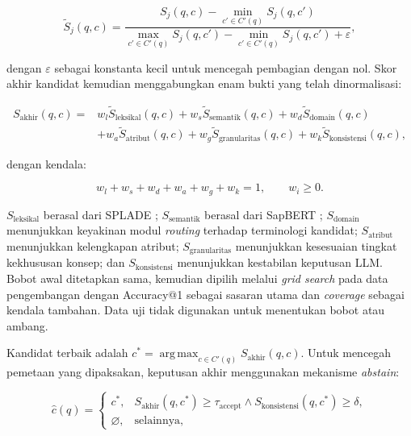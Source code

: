 \begin{equation}
\widetilde{S}_{j}(q,c)=
\frac{S_j(q,c)-\min_{c'\in C'(q)}S_j(q,c')}
{\max_{c'\in C'(q)}S_j(q,c')-\min_{c'\in C'(q)}S_j(q,c')+\varepsilon},
\label{eq:score-normalization}
\end{equation}

dengan $\varepsilon$ sebagai konstanta kecil untuk mencegah pembagian dengan nol. Skor akhir kandidat kemudian menggabungkan enam bukti yang telah dinormalisasi:

\begin{equation}
\begin{split}
S_{\mathrm{akhir}}(q,c)={}&
w_l\widetilde{S}_{\mathrm{leksikal}}(q,c)
+w_s\widetilde{S}_{\mathrm{semantik}}(q,c)
+w_d\widetilde{S}_{\mathrm{domain}}(q,c)\\
&+w_a\widetilde{S}_{\mathrm{atribut}}(q,c)
+w_g\widetilde{S}_{\mathrm{granularitas}}(q,c)
+w_k\widetilde{S}_{\mathrm{konsistensi}}(q,c),
\end{split}
\label{eq:final-mapping-score}
\end{equation}

dengan kendala:

\begin{equation}
w_l+w_s+w_d+w_a+w_g+w_k=1,
\qquad w_i\geq0.
\label{eq:score-weight-constraint}
\end{equation}

$S_{\mathrm{leksikal}}$ berasal dari SPLADE \citep{formal_splade_2021}; $S_{\mathrm{semantik}}$ berasal dari SapBERT \citep{liu_self-alignment_2021}; $S_{\mathrm{domain}}$ menunjukkan keyakinan modul \textit{routing} terhadap terminologi kandidat; $S_{\mathrm{atribut}}$ menunjukkan kelengkapan atribut; $S_{\mathrm{granularitas}}$ menunjukkan kesesuaian tingkat kekhususan konsep; dan $S_{\mathrm{konsistensi}}$ menunjukkan kestabilan keputusan LLM. Bobot awal ditetapkan sama, kemudian dipilih melalui \textit{grid search} pada data pengembangan dengan Accuracy@1 sebagai sasaran utama dan \textit{coverage} sebagai kendala tambahan. Data uji tidak digunakan untuk menentukan bobot atau ambang.

Kandidat terbaik adalah $c^*=\operatorname*{arg\,max}_{c\in C'(q)}S_{\mathrm{akhir}}(q,c)$. Untuk mencegah pemetaan yang dipaksakan, keputusan akhir menggunakan mekanisme \textit{abstain}:

\begin{equation}
\widehat{c}(q)=
\begin{cases}
c^*, & S_{\mathrm{akhir}}(q,c^*)\geq\tau_{\mathrm{accept}}
\land S_{\mathrm{konsistensi}}(q,c^*)\geq\delta,\\
\varnothing, & \text{selainnya},
\end{cases}
\label{eq:acceptance-decision}
\end{equation}

